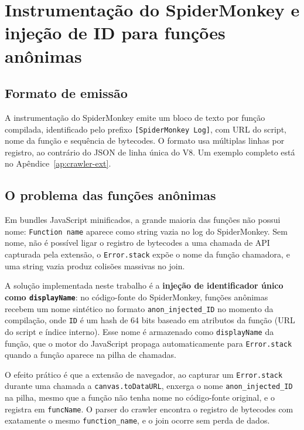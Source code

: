 \section{Instrumentação do SpiderMonkey e injeção de ID para funções anônimas}
\label{sec:sm}

\subsection{Formato de emissão}
\label{sub:sm-formato}

A instrumentação do SpiderMonkey emite um bloco de texto por função compilada,
identificado pelo prefixo \texttt{[SpiderMonkey Log]}, com URL do script, nome da
função e sequência de bytecodes. O formato usa múltiplas linhas por registro,
ao contrário do JSON de linha única do V8. Um exemplo completo está no
Apêndice~\ref{ap:crawler-ext}.

\subsection{O problema das funções anônimas}
\label{sub:sm-anon}

Em bundles JavaScript minificados, a grande maioria das funções não possui
nome: \texttt{Function name} aparece como string vazia no log do SpiderMonkey. Sem
nome, não é possível ligar o registro de bytecodes a uma chamada de API capturada
pela extensão, o \texttt{Error.stack} expõe o nome da função chamadora, e uma
string vazia produz colisões massivas no join.

A solução implementada neste trabalho é a \textbf{injeção de identificador único
como \texttt{displayName}}: no código-fonte do SpiderMonkey, funções anônimas
recebem um nome sintético no formato \texttt{anon\_injected\_ID} no momento da
compilação, onde \texttt{ID} é um hash de 64 bits baseado em atributos da função
(URL do script e índice interno). Esse nome é armazenado como \texttt{displayName}
da função, que o motor do JavaScript propaga automaticamente para
\texttt{Error.stack} quando a função aparece na pilha de chamadas.

O efeito prático é que a extensão de navegador, ao capturar um \texttt{Error.stack}
durante uma chamada a \texttt{canvas.toDataURL}, enxerga o nome
\texttt{anon\_injected\_ID} na pilha, mesmo que a função não tenha nome no
código-fonte original, e o registra em \texttt{funcName}. O parser do
crawler encontra o registro de bytecodes com exatamente o mesmo
\texttt{function\_name}, e o join ocorre sem perda de dados.

